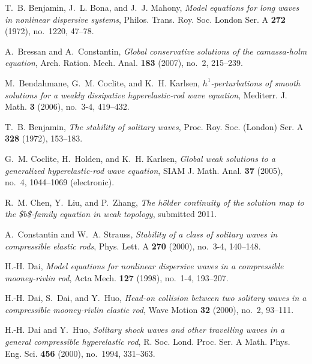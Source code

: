 \documentclass[12pt,reqno]{amsart}
\numberwithin{equation}{section}  %
\numberwithin{figure}{section}
\begin{document}
\begin{thebibliography}{HKM09}

T.~B. Benjamin, J.~L. Bona, and J.~J. Mahony, \emph{Model equations for long
  waves in nonlinear dispersive systems}, Philos. Trans. Roy. Soc. London Ser.
  A \textbf{272} (1972), no.~1220, 47--78.

A.~Bressan and A.~Constantin, \emph{Global conservative solutions of the
  camassa-holm equation}, Arch. Ration. Mech. Anal. \textbf{183} (2007), no.~2,
  215--239.

M.~Bendahmane, G.~M. Coclite, and K.~H. Karlsen,
  \emph{$h^1$-perturbations of smooth solutions for a weakly dissipative
  hyperelastic-rod wave equation}, Mediterr. J. Math. \textbf{3} (2006),
  no.~3-4, 419--432.

T.~B. Benjamin, \emph{The stability of solitary waves}, Proc. Roy. Soc.
  (London) Ser. A \textbf{328} (1972), 153--183.

G.~M. Coclite, H.~Holden, and K.~H. Karlsen, \emph{Global weak solutions to a
  generalized hyperelastic-rod wave equation}, SIAM J. Math. Anal. \textbf{37}
  (2005), no.~4, 1044--1069 (electronic).

R.~M. Chen, Y.~Liu, and P.~Zhang, \emph{The h{\"o}lder continuity of the
  solution map to the {\$}b{\$}-family equation in weak topology}, submitted 2011.

A.~Constantin and W.~A. Strauss, \emph{Stability of a class of solitary waves
  in compressible elastic rods}, Phys. Lett. A \textbf{270} (2000), no.~3-4,
  140--148.

H.-H. Dai, \emph{Model equations for nonlinear dispersive waves in a
  compressible mooney-rivlin rod}, Acta Mech. \textbf{127} (1998), no.~1-4,
  193--207.

H.-H. Dai, S.~Dai, and Y.~Huo, \emph{Head-on collision between two solitary
  waves in a compressible mooney-rivlin elastic rod}, Wave Motion \textbf{32}
  (2000), no.~2, 93--111.

H.-H. Dai and Y.~Huo, \emph{Solitary shock waves and other travelling waves in
  a general compressible hyperelastic rod}, R. Soc. Lond. Proc. Ser. A Math.
  Phys. Eng. Sci. \textbf{456} (2000), no.~1994, 331--363.


\end{thebibliography}
\end{document}

